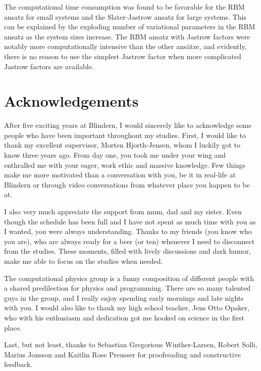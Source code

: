 The computational time consumption was found to be favorable for the RBM ansatz for small systems and the Slater-Jastrow ansatz for large systems. This can be explained by the exploding number of variational parameters in the RBM ansatz as the system sizes increase. The RBM ansatz with Jastrow factors were notably more computationally intensive than the other ansätze, and evidently, there is no reason to use the simplest Jastrow factor when more complicated Jastrow factors are available.

\thispagestyle{empty}
\cleardoublepage

\section*{Acknowledgements}
After five exciting years at Blindern, I would sincerely like to acknowledge some people who have been important throughout my studies. First, I would like to thank my excellent supervisor, Morten Hjorth-Jensen, whom I luckily got to know three years ago. From day one, you took me under your wing and enthralled me with your eager, work ethic and massive knowledge. Few things make me more motivated than a conversation with you, be it in real-life at Blindern or through video conversations from whatever place you happen to be at.

I also very much appreciate the support from mum, dad and my sister. Even though the schedule has been full and I have not spent as much time with you as I wanted, you were always understanding. Thanks to my friends (you know who you are), who are always ready for a beer (or ten) whenever I need to disconnect from the studies. These moments, filled with lively discussions and dark humor, make me able to focus on the studies when needed.

The computational physics group is a funny composition of different people with a shared predilection for physics and programming. There are so many talented guys in the group, and I really enjoy spending early mornings and late nights with you. I would also like to thank my high school teacher, Jens Otto Opaker, who with his enthusiasm and dedication got me hooked on science in the first place.

Last, but not least, thanks to Sebastian Gregorious Winther-Larsen, Robert Solli, Marius Jonsson and Kaitlin Rose Preusser for proofreading and constructive feedback.\vspace{5cm}


